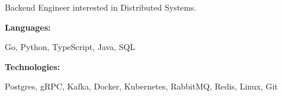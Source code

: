 \documentclass[9pt]{developercv} %
\begin{document}
\begin{minipage}[t]{0.46\textwidth}
	\vspace{-6pt}
	Backend Engineer interested in Distributed Systems.
	\vspace{-6pt}
\end{minipage}
\hfill %
\begin{minipage}[t]{0.465\textwidth}
	\vspace{-6pt}

	\begin{minipage}[t]{0.2\textwidth}
		\textbf{Languages:}
	\end{minipage}
	\hfill
	\begin{minipage}[t]{0.73\textwidth}
		Go, Python, TypeScript, Java, SQL
	\end{minipage}
	\vspace{4mm}

	\begin{minipage}[t]{0.2\textwidth}
		\textbf{Technologies:}
	\end{minipage}
	\hfill
	\begin{minipage}[t]{0.73\textwidth}
		Postgres, gRPC, Kafka, Docker, Kubernetes, RabbitMQ, Redis, Linux, Git
	\end{minipage}

\end{minipage}
\end{document}
